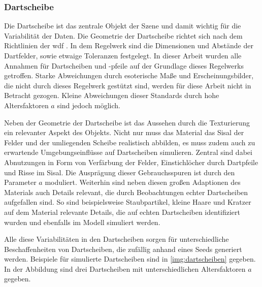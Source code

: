 \subsubsection{Dartscheibe}
\label{sec:met:data:model:obejcts:board}

Die Dartscheibe ist das zentrale Objekt der Szene und damit wichtig für die Variabilität der Daten. Die Geometrie der Dartscheibe richtet sich nach dem Richtlinien  der \ac{wdf} \cite{wdf-rules}. In dem Regelwerk sind die Dimensionen und Abstände der Dartfelder, sowie etwaige Toleranzen festgelegt. In dieser Arbeit wurden alle Annahmen für Dartscheiben und -pfeile auf der Grundlage dieses Regelwerks getroffen. Starke Abweichungen durch esoterische Maße und Erscheinungsbilder, die nicht durch dieses Regelwerk gestützt sind, werden für diese Arbeit nicht in Betracht gezogen. Kleine Abweichungen dieser Standards durch hohe Altersfaktoren $a$ sind jedoch möglich.

Neben der Geometrie der Dartscheibe ist das Aussehen durch die Texturierung ein relevanter Aspekt des Objekts. Nicht nur muss das Material das Sisal der Felder und der umliegenden Scheibe realistisch abbilden, es muss zudem auch zu erwartende Umgebungseinflüsse auf Dartscheiben simulieren. Zentral sind dabei Abnutzungen in Form von Verfärbung der Felder, Einstichlöcher durch Dartpfeile und Risse im Sisal. Die Ausprägung dieser Gebrauchsspuren ist durch den Parameter $a$ moduliert.
Weiterhin sind neben diesen großen Adaptionen des Materials auch Details relevant, die durch Beobachtungen echter Dartscheiben aufgefallen sind. So sind beispielsweise Staubpartikel, kleine Haare und Kratzer auf dem Material relevante Details, die auf echten Dartscheiben identifiziert wurden und ebenfalls im Modell simuliert werden.

Alle diese Variabilitäten in den Dartscheiben sorgen für unterschiedliche Beschaffenheiten von Dartscheiben, die zufällig anhand eines Seeds generiert werden. Beispiele für simulierte Dartscheiben sind in \autoref{img:dartscheiben} gegeben. In der Abbildung sind drei Dartscheiben mit unterschiedlichen Altersfaktoren $a$ gegeben.

